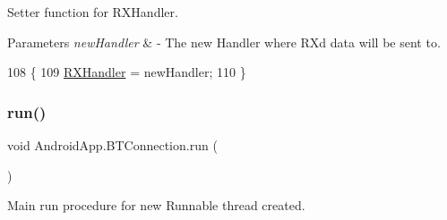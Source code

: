 Setter function for R\+X\+Handler. 


\begin{DoxyParams}{Parameters}
{\em new\+Handler} & -\/ The new Handler where RX\textquotesingle{}d data will be sent to. \\
\hline
\end{DoxyParams}

\begin{DoxyCode}
108                                                  \{
109         \hyperlink{class_android_app_1_1_b_t_connection_a4e3bfea96a4ddbd2cd2b76bb4ce8b871}{RXHandler} = newHandler;
110     \}
\end{DoxyCode}
\mbox{\label{class_android_app_1_1_b_t_connection_a03907fd685748cb0da88a7f17d90885f}} 
\subsubsection{\texorpdfstring{run()}{run()}}
{\footnotesize\ttfamily void Android\+App.\+B\+T\+Connection.\+run (\begin{DoxyParamCaption}{ }\end{DoxyParamCaption})\hspace{0.3cm}{\ttfamily [inline]}}



Main run procedure for new Runnable thread created. 

